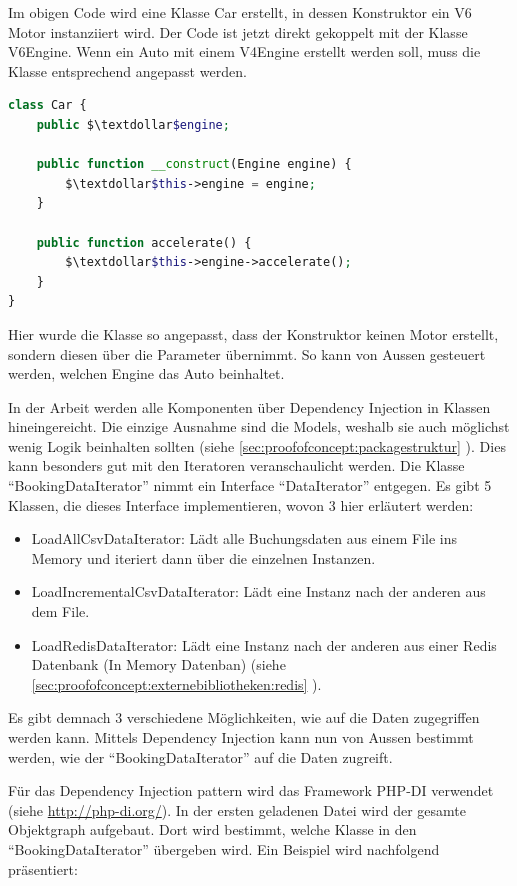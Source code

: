 Im obigen Code wird eine Klasse Car erstellt, in dessen Konstruktor ein V6 Motor instanziiert  wird. Der Code ist jetzt direkt gekoppelt mit der Klasse V6Engine. Wenn ein Auto mit einem V4Engine erstellt werden soll, muss die Klasse entsprechend angepasst werden. 


\begin{lstlisting}[language=php]
class Car {
	public $\textdollar$engine;
	
	public function __construct(Engine engine) {
		$\textdollar$this->engine = engine;
	}
	
	public function accelerate() {
		$\textdollar$this->engine->accelerate();
	}
}
\end{lstlisting}

Hier wurde die Klasse so angepasst, dass der Konstruktor keinen Motor erstellt, sondern diesen über die Parameter übernimmt. So kann von Aussen gesteuert werden, welchen Engine das Auto beinhaltet. 

In der Arbeit werden alle Komponenten über Dependency Injection in Klassen hineingereicht. Die einzige Ausnahme sind die Models, weshalb sie auch möglichst wenig Logik beinhalten sollten (siehe \cref{sec:proofofconcept:packagestruktur} ). Dies kann besonders gut mit den Iteratoren veranschaulicht werden. Die Klasse "`BookingDataIterator"' nimmt ein Interface "`DataIterator"' entgegen. Es gibt 5 Klassen, die dieses Interface implementieren, wovon 3 hier erläutert werden:
\begin{itemize}
	\item LoadAllCsvDataIterator: Lädt alle Buchungsdaten aus einem File ins Memory und iteriert dann über die einzelnen Instanzen.
	\item LoadIncrementalCsvDataIterator: Lädt eine Instanz nach der anderen aus dem File.
	\item LoadRedisDataIterator: Lädt eine Instanz nach der anderen aus einer Redis Datenbank (In Memory Datenban) (siehe \cref{sec:proofofconcept:externebibliotheken:redis} ).
\end{itemize}

Es gibt demnach 3 verschiedene Möglichkeiten, wie auf die Daten zugegriffen werden kann. Mittels Dependency Injection kann nun von Aussen bestimmt werden, wie der "`BookingDataIterator"' auf die Daten zugreift.

Für das Dependency Injection \gls{pattern}
 wird das Framework PHP-DI verwendet (siehe \url{http://php-di.org/}). In der ersten geladenen Datei wird der gesamte Objektgraph aufgebaut. Dort wird bestimmt, welche Klasse in den "`BookingDataIterator"' übergeben wird. Ein Beispiel wird nachfolgend präsentiert:
 
